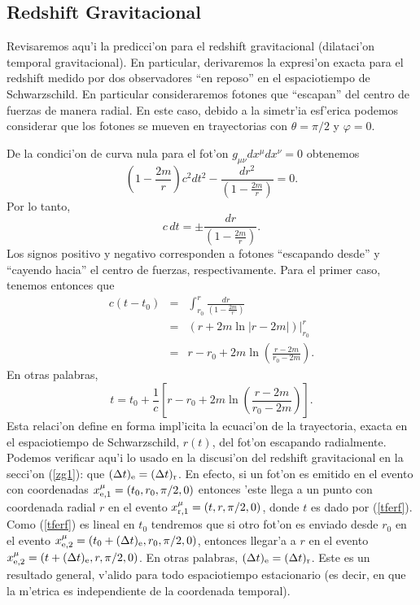 \subsection{Redshift Gravitacional}\label{sec:redshift}
Revisaremos aqu'i la predicci'on para el redshift gravitacional (dilataci'on temporal gravitacional). En particular, derivaremos la expresi'on exacta para el redshift medido por dos observadores ``en reposo'' en el espaciotiempo de Schwarzschild. En particular consideraremos fotones que ``escapan'' del centro de fuerzas de manera radial. En este caso, debido a la simetr'ia esf'erica podemos considerar que los fotones se mueven en trayectorias con $\theta=\pi/2$ y $\varphi=0$.

De la condici'on de curva nula para el fot'on $g_{\mu\nu}dx^\mu dx^\nu=0$ obtenemos
\begin{equation}
 \left(1-\frac{2m}{r}\right)c^2dt^2-\frac{dr^2}{ \left(1-\frac{2m}{r}\right)}=0.
\end{equation}
Por lo tanto,
\begin{equation}
 c\,dt=\pm\frac{dr}{ \left(1-\frac{2m}{r}\right)}.
\end{equation}
Los signos positivo y negativo corresponden a fotones ``escapando desde'' y ``cayendo hacia'' el centro de fuerzas, respectivamente. Para el primer caso, tenemos entonces que
\begin{eqnarray}
 c(t-t_0)&=&\int^r_{r_0}\frac{dr}{\left(1-\frac{2m}{r}\right)} \\
&=&\left.\left(r+2m\ln|r-2m|\right)\right|^r_{r_0} \\
&=&r-r_0+2m\ln\left(\frac{r-2m}{r_0-2m}\right).
\end{eqnarray}
En otras palabras,
\begin{equation} \label{tferf}
 t=t_0+\frac{1}{c}\left[r-r_0+2m\ln\left(\frac{r-2m}{r_0-2m}\right)\right].
\end{equation}
Esta relaci'on define en forma impl'icita la ecuaci'on de la trayectoria, exacta en el espaciotiempo de Schwarzschild, $r(t)$, del fot'on escapando radialmente. Podemos verificar  aqu'i lo usado en la discusi'on del redshift gravitacional en la secci'on (\ref{zg1}): que $(\Delta t)_{\rm e}=(\Delta t)_{\rm r}$. En efecto, si un fot'on es emitido en el evento con coordenadas $x^\mu_{{\rm e},1}=(t_0,r_0,\pi/2,0)$ entonces 'este llega a un punto con coordenada radial $r$ en el evento $x^\mu_{{\rm r},1}=(t,r,\pi/2,0)$, donde $t$ es dado por (\ref{tferf}). Como (\ref{tferf}) es lineal en $t_0$ tendremos que si otro fot'on es enviado desde $r_0$ en el evento $x^\mu_{{\rm e},2}=(t_0+(\Delta t)_{\rm e},r_0,\pi/2,0)$, entonces llegar'a a $r$ en el evento $x^\mu_{{\rm e},2}=(t+(\Delta t)_{\rm e},r,\pi/2,0)$. En otras palabras, $(\Delta t)_{\rm e}=(\Delta t)_{\rm r}$. Este es un resultado general, v'alido para todo espaciotiempo estacionario (es decir, en que la m'etrica es independiente de la coordenada temporal).

